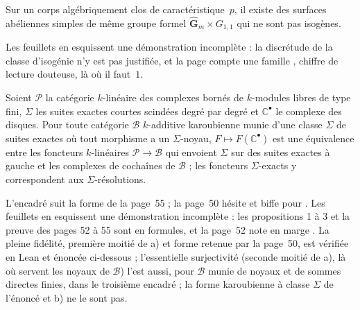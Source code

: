 \begin{encadre}
\begin{theoreme*}\nonverifie
Sur un corps algébriquement clos de caractéristique~$p$, il existe des surfaces abéliennes simples de même groupe formel $\hat{\mathbf G}_m \times G_{1,1}$ qui ne sont pas isogènes.
\end{theoreme*}
\end{encadre}
{\small Les feuillets en esquissent une démonstration incomplète : la discrétude de la classe d'isogénie n'y est pas justifiée, et la page compte une famille , chiffre de lecture douteuse, là où il faut~$1$.\par}

\begin{encadre}
\begin{theoreme*}\nonverifie
Soient $\mathcal P$ la catégorie $k$-linéaire des complexes bornés de $k$-modules libres de type fini, $\Sigma$ les suites exactes courtes scindées degré par degré et $\mathbb C^\bullet$ le complexe des disques. Pour toute catégorie $\mathcal B$ $k$-additive karoubienne munie d'une classe $\Sigma$ de suites exactes où tout morphisme a un $\Sigma$-noyau, $F \mapsto F(\mathbb C^\bullet)$ est une équivalence entre les foncteurs $k$-linéaires $\mathcal P \to \mathcal B$ qui envoient $\Sigma$ sur des suites exactes à gauche et les complexes de cochaînes de $\mathcal B$ ; les foncteurs $\Sigma$-exacts y correspondent aux $\Sigma$-résolutions.
\end{theoreme*}
\end{encadre}
{\small L'encadré suit la forme de la page~55 ; la page~50 hésite et biffe  pour . Les feuillets en esquissent une démonstration incomplète : les propositions 1 à 3 et la preuve des pages 52 à 55 sont en formules, et la page~52 note en marge . La pleine fidélité, première moitié de a) et forme retenue par la page~50, est vérifiée en Lean et énoncée ci-dessous ; l'essentielle surjectivité (seconde moitié de a), là où servent les noyaux de $\mathcal B$) l'est aussi, pour $\mathcal B$ munie de noyaux et de sommes directes finies, dans le troisième encadré ; la forme karoubienne à classe $\Sigma$ de l'énoncé et b) ne le sont pas.\par}

